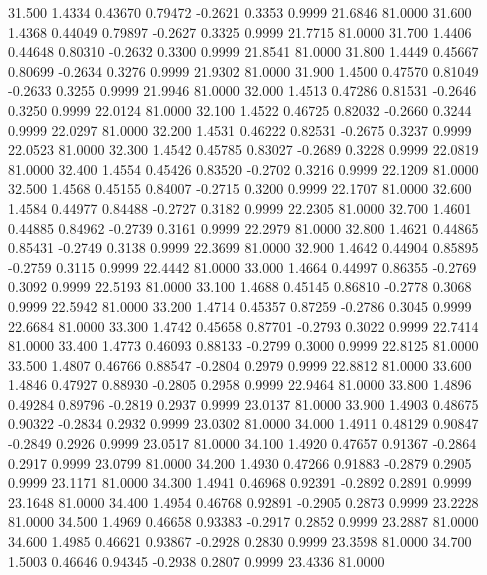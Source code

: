   31.500   1.4334   0.43670   0.79472  -0.2621   0.3353   0.9999  21.6846  81.0000
  31.600   1.4368   0.44049   0.79897  -0.2627   0.3325   0.9999  21.7715  81.0000
  31.700   1.4406   0.44648   0.80310  -0.2632   0.3300   0.9999  21.8541  81.0000
  31.800   1.4449   0.45667   0.80699  -0.2634   0.3276   0.9999  21.9302  81.0000
  31.900   1.4500   0.47570   0.81049  -0.2633   0.3255   0.9999  21.9946  81.0000
  32.000   1.4513   0.47286   0.81531  -0.2646   0.3250   0.9999  22.0124  81.0000
  32.100   1.4522   0.46725   0.82032  -0.2660   0.3244   0.9999  22.0297  81.0000
  32.200   1.4531   0.46222   0.82531  -0.2675   0.3237   0.9999  22.0523  81.0000
  32.300   1.4542   0.45785   0.83027  -0.2689   0.3228   0.9999  22.0819  81.0000
  32.400   1.4554   0.45426   0.83520  -0.2702   0.3216   0.9999  22.1209  81.0000
  32.500   1.4568   0.45155   0.84007  -0.2715   0.3200   0.9999  22.1707  81.0000
  32.600   1.4584   0.44977   0.84488  -0.2727   0.3182   0.9999  22.2305  81.0000
  32.700   1.4601   0.44885   0.84962  -0.2739   0.3161   0.9999  22.2979  81.0000
  32.800   1.4621   0.44865   0.85431  -0.2749   0.3138   0.9999  22.3699  81.0000
  32.900   1.4642   0.44904   0.85895  -0.2759   0.3115   0.9999  22.4442  81.0000
  33.000   1.4664   0.44997   0.86355  -0.2769   0.3092   0.9999  22.5193  81.0000
  33.100   1.4688   0.45145   0.86810  -0.2778   0.3068   0.9999  22.5942  81.0000
  33.200   1.4714   0.45357   0.87259  -0.2786   0.3045   0.9999  22.6684  81.0000
  33.300   1.4742   0.45658   0.87701  -0.2793   0.3022   0.9999  22.7414  81.0000
  33.400   1.4773   0.46093   0.88133  -0.2799   0.3000   0.9999  22.8125  81.0000
  33.500   1.4807   0.46766   0.88547  -0.2804   0.2979   0.9999  22.8812  81.0000
  33.600   1.4846   0.47927   0.88930  -0.2805   0.2958   0.9999  22.9464  81.0000
  33.800   1.4896   0.49284   0.89796  -0.2819   0.2937   0.9999  23.0137  81.0000
  33.900   1.4903   0.48675   0.90322  -0.2834   0.2932   0.9999  23.0302  81.0000
  34.000   1.4911   0.48129   0.90847  -0.2849   0.2926   0.9999  23.0517  81.0000
  34.100   1.4920   0.47657   0.91367  -0.2864   0.2917   0.9999  23.0799  81.0000
  34.200   1.4930   0.47266   0.91883  -0.2879   0.2905   0.9999  23.1171  81.0000
  34.300   1.4941   0.46968   0.92391  -0.2892   0.2891   0.9999  23.1648  81.0000
  34.400   1.4954   0.46768   0.92891  -0.2905   0.2873   0.9999  23.2228  81.0000
  34.500   1.4969   0.46658   0.93383  -0.2917   0.2852   0.9999  23.2887  81.0000
  34.600   1.4985   0.46621   0.93867  -0.2928   0.2830   0.9999  23.3598  81.0000
  34.700   1.5003   0.46646   0.94345  -0.2938   0.2807   0.9999  23.4336  81.0000

